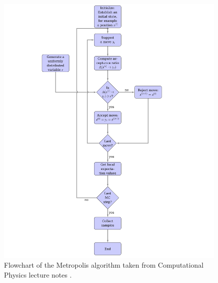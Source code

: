 \documentclass[english,notitlepage,reprint,nofootinbib]{revtex4-1}  %
\begin{document}
\begin{figure}[H]
    \centering
    \includegraphics[width=1\textwidth]{../figures//metro_flow.jpg}
    \caption{Flowchart of the Metropolis algorithm taken from Computational Physics lecture notes \cite{compedium}.}
    \label{fig:metro_flow}
\end{figure}
\end{document}
